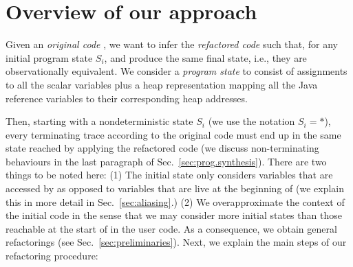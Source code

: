 \documentclass[runningheads,a4paper]{llncs}
\begin{document}
\section{Overview of our approach} \label{sec:approach}

Given an {\em original code} , we want to infer the 
{\em refactored code}  such that, for any initial program state
$S_i$,  and  produce the same final
state, i.e., they are observationally equivalent.
We consider a {\em program state} to consist of  
assignments to all the scalar variables plus a
heap representation mapping all the Java reference variables 
to their corresponding heap addresses.
%
%

Then, starting with a nondeterministic 
state $S_i$ (we use the notation $S_i{=}*$), every terminating trace according to the original code must end up in the same state
reached by applying the refactored code
(we discuss non-terminating behaviours in the last
paragraph of Sec.~\ref{sec:prog.synthesis}).
%
There are two things to be noted here:
(1) The initial state only considers variables that
are accessed by  as opposed to variables
that are live at the beginning of 
(we explain this in more detail in Sec.~\ref{sec:aliasing}.)
(2) We overapproximate the context of the initial code
in the sense that we may consider more initial states than
those reachable at the start of  in the user code.  
As a consequence, we obtain general refactorings (see Sec.~\ref{sec:preliminaries}).
%
%
%
%
Next, we explain the main steps of our refactoring procedure:
\end{document}
